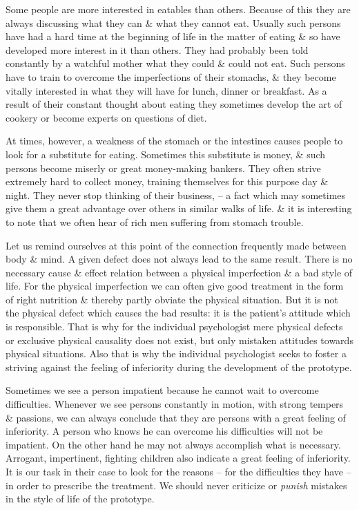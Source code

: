 \documentclass{article}
\begin{document}
Some people are more interested in eatables than others. Because of this they are always discussing what they can \& what they cannot eat. Usually such persons have had a hard time at the beginning of life in the matter of eating \& so have developed more interest in it than others. They had probably been told constantly by a watchful mother what they could \& could not eat. Such persons have to train to overcome the imperfections of their stomachs, \& they become vitally interested in what they will have for lunch, dinner or breakfast. As a result of their constant thought about eating they sometimes develop the art of cookery or become experts on questions of diet.

At times, however, a weakness of the stomach or the intestines causes people to look for a substitute for eating. Sometimes this substitute is money, \& such persons become miserly or great money-making bankers. They often strive extremely hard to collect money, training themselves for this purpose day \& night. They never stop thinking of their business, -- a fact which may sometimes give them a great advantage over others in similar walks of life. \& it is interesting to note that we often hear of rich men suffering from stomach trouble.

Let us remind ourselves at this point of the connection frequently made between body \& mind. A given defect does not always lead to the same result. There is no necessary cause \& effect relation between a physical imperfection \& a bad style of life. For the physical imperfection we can often give good treatment in the form of right nutrition \& thereby partly obviate the physical situation. But it is not the physical defect which causes the bad results: it is the patient's attitude which is responsible. That is why for the individual psychologist mere physical defects or exclusive physical causality does not exist, but only mistaken attitudes towards physical situations. Also that is why the individual psychologist seeks to foster a striving against the feeling of inferiority during the development of the prototype.

Sometimes we see a person impatient because he cannot wait to overcome difficulties. Whenever we see persons constantly in motion, with strong tempers \& passions, we can always conclude that they are persons with a great feeling of inferiority. A person who knows he can overcome his difficulties will not be impatient. On the other hand he may not always accomplish what is necessary. Arrogant, impertinent, fighting children also indicate a great feeling of inferiority. It is our task in their case to look for the reasons -- for the difficulties they have -- in order to prescribe the treatment. We should never criticize or \textit{punish} mistakes in the style of life of the prototype.
\end{document}
